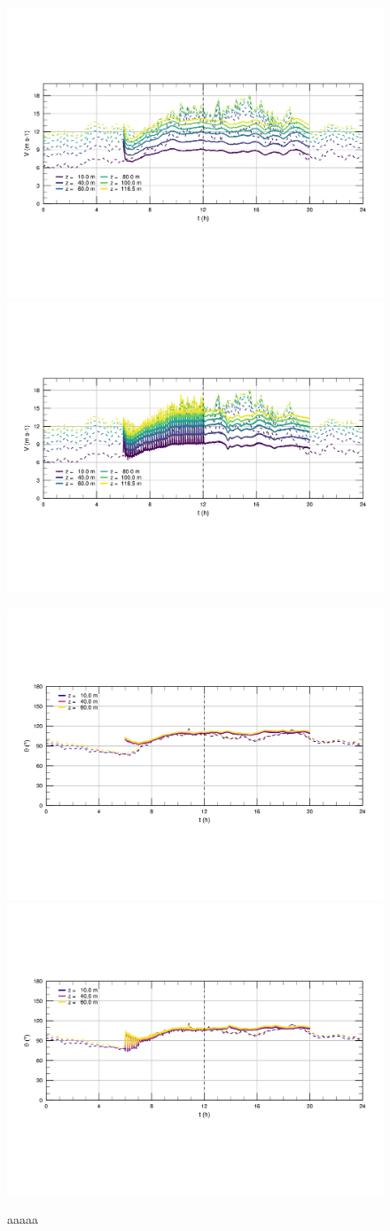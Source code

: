 \begin{figure}[H]
	\centering
	\includegraphics[width=0.5\linewidth,trim={9mm 63mm 10mm 55mm},clip]{Imagenes/06/hov/ts_v}%
	\includegraphics[width=0.5\linewidth,trim={9mm 63mm 10mm 55mm},clip]{Imagenes/06/hov_da/ts_v}%
	
	\includegraphics[width=0.5\linewidth,trim={12mm 55mm 10mm 55mm},clip]{Imagenes/06/hov/ts_o}%
	\includegraphics[width=0.5\linewidth,trim={12mm 55mm 10mm 55mm},clip]{Imagenes/06/hov_da/ts_o}%
	\caption{aaaaa}
	\label{fig:06_hov_ts}
\end{figure}

